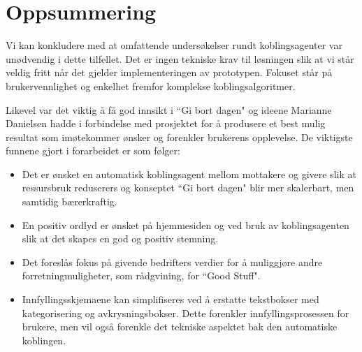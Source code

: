 \section{Oppsummering}
Vi kan konkludere med at omfattende undersøkelser rundt koblingsagenter var unødvendig i dette tilfellet. Det er ingen tekniske krav til løsningen slik at vi står veldig fritt når det gjelder implementeringen av prototypen. Fokuset står på brukervennlighet og enkelhet fremfor komplekse koblingsalgoritmer.

Likevel var det viktig å få god innsikt i ``Gi bort dagen" og ideene Marianne Danielsen hadde i forbindelse med prosjektet for å produsere et best mulig resultat som imøtekommer ønsker og forenkler brukerens opplevelse. De viktigste funnene gjort i forarbeidet  er som følger:

\begin{itemize}
    \item Det er ønsket en automatisk koblingsagent mellom mottakere og givere slik at ressursbruk reduserers og konseptet ``Gi bort dagen" blir mer skalerbart, men samtidig bærerkraftig.
    \item En positiv ordlyd er ønsket på hjemmesiden og ved bruk av koblingsagenten slik at det skapes en god og positiv stemning.
    \item Det foreslås fokus på givende bedrifters verdier for å muliggjøre andre forretningmuligheter, som rådgvining, for ``Good Stuff".
    \item Innfyllingsskjemaene kan simplifiseres ved å erstatte tekstbokser med kategorisering og avkrysningsbokser. Dette forenkler innfyllingsprosessen for brukere, men vil også forenkle det tekniske aspektet bak den automatiske koblingen.
\end{itemize}
